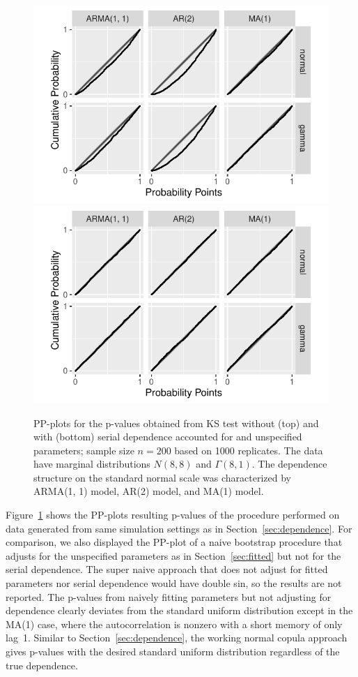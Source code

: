 \documentclass[12pt, letterpaper, titlepage]{article}
\begin{document}
\begin{figure}[tbp]
  \centering
  \includegraphics[width=.75\textwidth]{pp_s_f.pdf}
  \includegraphics[width=.75\textwidth]{pp_ssf.pdf}
  \caption{PP-plots for the p-values obtained from KS test without (top) and 
	  with (bottom)
    serial dependence accounted for and unspecified parameters; sample size
    $n = 200$ based on
    1000 replicates. The data have marginal distributions $N(8, 8)$ and
    $\Gamma(8, 1)$. The dependence structure on the standard normal scale was
    characterized by ARMA(1, 1) model, AR(2) model, and MA(1) model.
  }
  \label{fig:pp_ssf}
\end{figure}

Figure~\ref{fig:pp_ssf} shows the PP-plots resulting p-values of the
procedure performed on data generated from same simulation settings as in
Section~\ref{sec:dependence}. For comparison, we also displayed the PP-plot of
a naive bootstrap procedure that adjusts for the unspecified parameters as in
Section~\ref{sec:fitted} but not for the serial dependence. 
The super naive approach that does not adjust for fitted parameters nor serial
dependence would have double sin, so the results are not reported. 
The p-values from
naively fitting parameters but not adjusting for dependence clearly deviates
from the standard uniform distribution except in the MA(1) case, where the
autocorrelation is nonzero with a short memory of only lag~1.
Similar to Section~\ref{sec:dependence}, the working normal copula approach
gives p-values with the desired standard uniform distribution regardless of the
true dependence.
\end{document}
